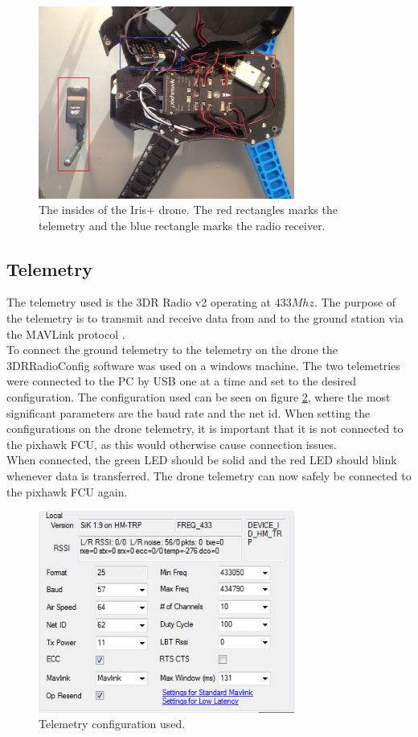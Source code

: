 \begin{figure}[H]
  \centering
    \includegraphics[width=0.75\textwidth]{./Images/insideIRIS}
\caption{The insides of the Iris+ drone. The red rectangles marks the telemetry and the blue
rectangle marks the radio receiver.}
  \label{fig:irisInside}
\end{figure}

\subsection*{Telemetry}
The telemetry used is the 3DR Radio v2 \cite{Ref:Telem} operating at $433 Mhz$. The purpose of the
telemetry is to transmit and receive data from and to the ground station via the MAVLink protocol
\cite{Ref:MAVLink}.\\
To connect the ground telemetry to the telemetry on the drone the 3DRRadioConfig software was used on a
windows machine. The two telemetries were connected to the PC by USB one at a time and set to the
desired configuration. The configuration used can be seen on figure \ref{fig:telem}, where the most
significant parameters are the baud rate and the net id. When setting the configurations on the drone
telemetry, it is important that it is not connected to the pixhawk FCU, as this would otherwise cause connection issues.\\
When connected, the green LED should be solid and the red LED should blink whenever data is
transferred. The drone telemetry can now safely be connected to the pixhawk FCU again.

\begin{figure}[H]
  \centering
    \includegraphics[width=0.75\textwidth]{./Images/telem}
  \caption{Telemetry configuration used.}
  \label{fig:telem}
\end{figure}

